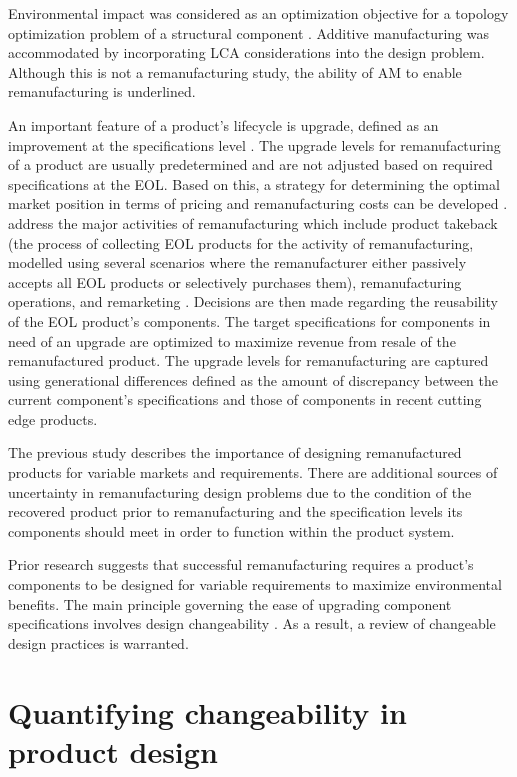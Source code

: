 Environmental impact was considered as an optimization objective for a topology optimization problem of a structural component \cite{Tang2016}. Additive manufacturing was accommodated by incorporating \ac{LCA} considerations into the design problem. Although this is not a remanufacturing study, the ability of \ac{AM} to enable remanufacturing is underlined.

An important feature of a product's lifecycle is upgrade, defined as an improvement at the specifications level \cite{Xing2007}. The upgrade levels for remanufacturing of a product are usually predetermined and are not adjusted based on required specifications at the \ac{EOL}. Based on this, a strategy for determining the optimal market position in terms of pricing and remanufacturing costs can be developed \cite{Kwak2013}. \citeauthor{Kwak2013} address the major activities of remanufacturing which include product takeback (the process of collecting \ac{EOL} products for the activity of remanufacturing, modelled using several scenarios where the remanufacturer either passively accepts all \ac{EOL} products or selectively purchases them), remanufacturing operations, and remarketing \cite{Kwak2013}. Decisions are then made regarding the reusability of the \ac{EOL} product's components. The target specifications for components in need of an upgrade are optimized to maximize revenue from resale of the remanufactured product. The upgrade levels for remanufacturing are captured using generational differences defined as the amount of discrepancy between the current component's specifications and those of components in recent cutting edge products.

The previous study describes the importance of designing remanufactured products for variable markets and requirements. There are additional sources of uncertainty in remanufacturing design problems due to the condition of the recovered product prior to remanufacturing and the specification levels its components should meet in order to function within the product system.

Prior research suggests that successful remanufacturing requires a product's components to be designed for variable requirements to maximize environmental benefits. The main principle governing the ease of upgrading component specifications involves design changeability \cite{Suh2007}. As a result, a review of changeable design practices is warranted.

\section{Quantifying changeability in product design}
\label{sec:changeability}

